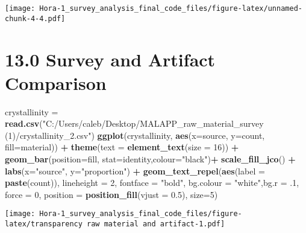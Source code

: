 \documentclass[
]{article}
\newenvironment{Shaded}{\begin{snugshade}}{\end{snugshade}}
\newcommand{\AttributeTok}[1]{\textcolor[rgb]{0.13,0.29,0.53}{#1}}
\newcommand{\DecValTok}[1]{\textcolor[rgb]{0.00,0.00,0.81}{#1}}
\newcommand{\FloatTok}[1]{\textcolor[rgb]{0.00,0.00,0.81}{#1}}
\newcommand{\FunctionTok}[1]{\textcolor[rgb]{0.13,0.29,0.53}{\textbf{#1}}}
\newcommand{\NormalTok}[1]{#1}
\newcommand{\OtherTok}[1]{\textcolor[rgb]{0.56,0.35,0.01}{#1}}
\newcommand{\SpecialCharTok}[1]{\textcolor[rgb]{0.81,0.36,0.00}{\textbf{#1}}}
\newcommand{\StringTok}[1]{\textcolor[rgb]{0.31,0.60,0.02}{#1}}
\begin{document}
\texttt{[image: Hora-1\_survey\_analysis\_final\_code\_files/figure-latex/unnamed-chunk-4-4.pdf]}

\hypertarget{survey-and-artifact-comparison}{%
\section{13.0 Survey and Artifact
Comparison}\label{survey-and-artifact-comparison}}

\begin{Shaded}
\begin{Highlighting}[]
\NormalTok{crystallinity }\OtherTok{=} \FunctionTok{read.csv}\NormalTok{(}\StringTok{"C:/Users/caleb/Desktop/MALAPP\_raw\_material\_survey (1)/crystallinity\_2.csv"}\NormalTok{)}
\FunctionTok{ggplot}\NormalTok{(crystallinity, }\FunctionTok{aes}\NormalTok{(}\AttributeTok{x=}\NormalTok{source, }\AttributeTok{y=}\NormalTok{count, }\AttributeTok{fill=}\NormalTok{material)) }\SpecialCharTok{+}
  \FunctionTok{theme}\NormalTok{(}\AttributeTok{text =} \FunctionTok{element\_text}\NormalTok{(}\AttributeTok{size =} \DecValTok{16}\NormalTok{)) }\SpecialCharTok{+}
  \FunctionTok{geom\_bar}\NormalTok{(}\AttributeTok{position=}\StringTok{\textquotesingle{}fill\textquotesingle{}}\NormalTok{, }\AttributeTok{stat=}\StringTok{\textquotesingle{}identity\textquotesingle{}}\NormalTok{,}\AttributeTok{colour=}\StringTok{"black"}\NormalTok{)}\SpecialCharTok{+}
  \FunctionTok{scale\_fill\_jco}\NormalTok{() }\SpecialCharTok{+}
  \FunctionTok{labs}\NormalTok{(}\AttributeTok{x=}\StringTok{"source"}\NormalTok{, }\AttributeTok{y=}\StringTok{"proportion"}\NormalTok{) }\SpecialCharTok{+}
  \FunctionTok{geom\_text\_repel}\NormalTok{(}\FunctionTok{aes}\NormalTok{(}\AttributeTok{label =} \FunctionTok{paste}\NormalTok{(count)), }
                \AttributeTok{lineheight =} \DecValTok{2}\NormalTok{,}
            \AttributeTok{fontface =} \StringTok{"bold"}\NormalTok{, }\AttributeTok{bg.colour =} \StringTok{"white"}\NormalTok{,}\AttributeTok{bg.r =}\NormalTok{ .}\DecValTok{1}\NormalTok{, }\AttributeTok{force =} \DecValTok{0}\NormalTok{,}
                \AttributeTok{position =} \FunctionTok{position\_fill}\NormalTok{(}\AttributeTok{vjust =} \FloatTok{0.5}\NormalTok{), }\AttributeTok{size=}\DecValTok{5}\NormalTok{)}
\end{Highlighting}
\end{Shaded}

\texttt{[image: Hora-1\_survey\_analysis\_final\_code\_files/figure-latex/transparency raw material and artifact-1.pdf]}
\end{document}

